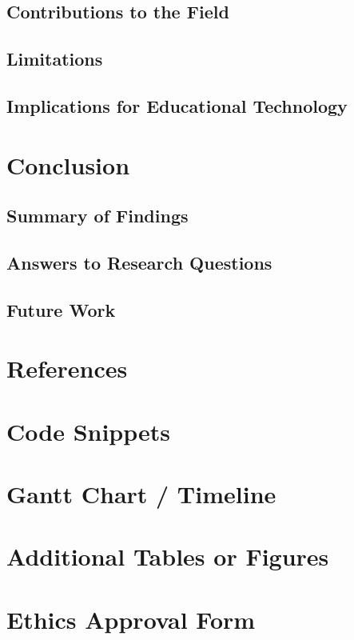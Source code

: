 \documentclass[12pt]{report}
\begin{document}
\section{Contributions to the Field}
\section{Limitations}
\section{Implications for Educational Technology}

\chapter{Conclusion}
\section{Summary of Findings}
\section{Answers to Research Questions}
\section{Future Work}

\chapter*{References}

\appendix
\chapter{Code Snippets}
\chapter{Gantt Chart / Timeline}
\chapter{Additional Tables or Figures}
\chapter{Ethics Approval Form}
\end{document}
